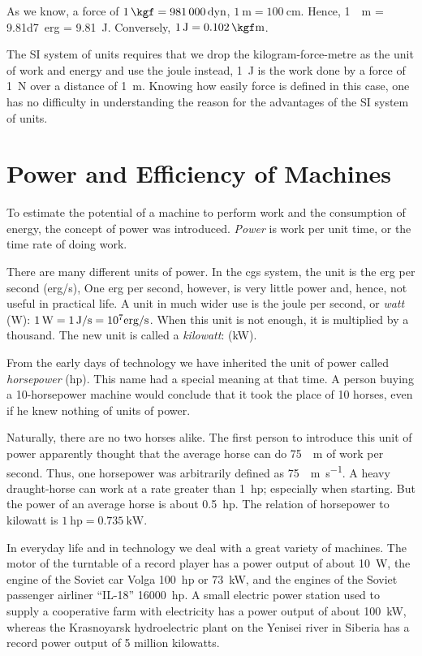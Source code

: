 As we know, a force of $\SI{1}{\kgf} = \num{981000} \, \textrm{dyn}$, $\SI{1}{\meter} = \SI{100}{\centi\meter}$. Hence, \SI{1}{\kgf\meter} = \num{9.81d7}\, \textrm{erg} = \SI{9.81}{\joule}. Conversely, $\SI{1}{\joule} = \SI{0.102}{\kgf\meter}$.

The SI system of units requires that we drop the kilogram-force-metre as the unit of work and energy and use the joule instead, \SI{1}{\joule} is the work done by a force of \SI{1}{\newton}
over a distance of \SI{1}{\meter}. Knowing how easily force is defined in this case, one has no difficulty in understanding the reason for the advantages of the SI system of units.

\section{Power and Efficiency of Machines}

To estimate the potential of a machine to perform work
and the consumption of energy, the concept of power was
introduced. \emph{Power} is work per unit time, or the time rate
of doing work.

There are many different units of power. In the cgs
system, the unit is the erg per second (erg/s), One erg
per second, however, is very little power and, hence, not
useful in practical life. A unit in much wider use is the
joule per second, or \emph{watt} (\si{\watt}): $\SI{1}{\watt} = \SI{1} {\joule\per\second} = \num{d7} \textrm{erg/s}$. When this unit is not enough, it is multiplied by a thousand. The new unit is called a \emph{kilowatt}: (\si{\kilo\watt}).

From the early days of technology we have inherited
the unit of power called \emph{horsepower} (hp). This name had
a special meaning at that time. A person buying a 10-horsepower machine would conclude that it took the place of 10 horses, even if he knew nothing of units of power.

Naturally, there are no two horses alike. The first person
to introduce this unit of power apparently thought that
the average horse can do \SI{75}{\kgf\meter} of work per second.
Thus, one horsepower was arbitrarily defined as \SI{75}{\kgf\meter\per\second}. A heavy draught-horse can work at a rate greater than 1~hp; especially when starting. But the power of an average horse is about 0.5~hp. The relation of horsepower to
kilowatt is $1~\textrm{hp} = \SI{0.735}{\kilo\watt}$.

In everyday life and in technology we deal with a
great variety of machines. The motor of the turntable of
a record player has a power output of about \SI{10}{\watt}, the
engine of the Soviet car Volga 100~hp or \SI{73}{\kilo\watt}, and the
engines of the Soviet passenger airliner ``IL-18'' \num{16 000}~hp.
A small electric power station used to supply a cooperative farm with electricity has a power output of about \SI{100}{\kilo\watt}, whereas the Krasnoyarsk hydroelectric plant on the Yenisei river in Siberia has a record power output of 5 million kilowatts.

